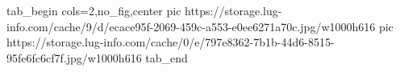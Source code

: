  
 
 
 
 

\ifcmt
  tab_begin cols=2,no_fig,center
     pic https://storage.lug-info.com/cache/9/d/ecace95f-2069-459c-a553-e0ee6271a70c.jpg/w1000h616%
		 pic https://storage.lug-info.com/cache/0/e/797e8362-7b1b-44d6-8515-95fe6fc6cf7f.jpg/w1000h616%
  tab_end
\fi
